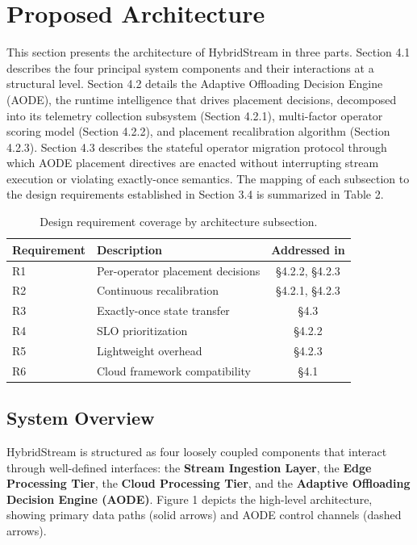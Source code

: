 \documentclass[preprint,review,12pt]{elsarticle}
\begin{document}
\section{Proposed Architecture}\label{proposed-architecture}

This section presents the architecture of HybridStream in three parts. Section 4.1 describes the four principal system components and their interactions at a structural level. Section 4.2 details the Adaptive Offloading Decision Engine (AODE), the runtime intelligence that drives placement decisions, decomposed into its telemetry collection subsystem (Section 4.2.1), multi-factor operator scoring model (Section 4.2.2), and placement recalibration algorithm (Section 4.2.3). Section 4.3 describes the stateful operator migration protocol through which AODE placement directives are enacted without interrupting stream execution or violating exactly-once semantics. The mapping of each subsection to the design requirements established in Section 3.4 is summarized in Table 2.


\begin{table}[htbp]
\centering
\caption{Design requirement coverage by architecture subsection.}
\label{tab:requirements}
\begin{tabular}{@{}llc@{}}
\toprule
Requirement & Description & Addressed in \\
\midrule
R1 & Per-operator placement decisions & \S4.2.2, \S4.2.3 \\
R2 & Continuous recalibration & \S4.2.1, \S4.2.3 \\
R3 & Exactly-once state transfer & \S4.3 \\
R4 & SLO prioritization & \S4.2.2 \\
R5 & Lightweight overhead & \S4.2.3 \\
R6 & Cloud framework compatibility & \S4.1 \\
\bottomrule
\end{tabular}
\end{table}


\subsection{System Overview}\label{system-overview}

HybridStream is structured as four loosely coupled components that interact through well-defined interfaces: the \textbf{Stream Ingestion Layer}, the \textbf{Edge Processing Tier}, the \textbf{Cloud Processing Tier}, and the \textbf{Adaptive Offloading Decision Engine (AODE)}. Figure 1 depicts the high-level architecture, showing primary data paths (solid arrows) and AODE control channels (dashed arrows).
\end{document}

